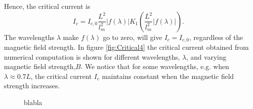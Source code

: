 Hence, the critical current is
\begin{equation}
    I_c = I_{c,0}\frac{L^2}{l_m^2}\left|f(\lambda)\right|K_1\left(\frac{L^2}{l_m^2}\left|f(\lambda)\right|\right).
\end{equation}
The wavelengths $\lambda$ make $f(\lambda)$ go to zero, will give $I_c = I_{c,0}$, regardless of the magnetic field strength. In figure \ref{fig:Critical4} the critical current obtained from numerical computation is shown for different wavelengths, $\lambda$, and varying magnetic field strength,$B$. We notice that for some wavelengths, e.g. when $\lambda \approx 0.7 L$, the critical current $I_c$ maintains constant when the magnetic field strength increases.
\begin{figure}[hhh]
\centering
\hfill
{}
\hfill
{}
\caption{blabla}
\label{fig:motionEarth}
\end{figure}
